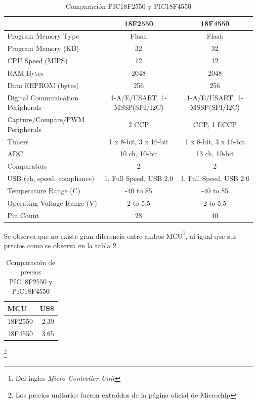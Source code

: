 \begin{table}[htp]
\begin{scriptsize}
\centering
\begin{tabular*}{\textwidth}{@{\extracolsep{\fill}}|l|c|c|} \hline
 \rowcolor[gray]{.9}
 & 18F2550 & 18F4550 												\\ \hline 
 Program Memory Type & Flash & Flash								\\ \hline
 Program Memory (KB) & 32 & 32										\\ \hline
 CPU Speed (MIPS) & 12 & 12											\\ \hline
 RAM Bytes & 2048 & 2048											\\ \hline
 Data EEPROM (bytes) & 256 & 256									\\ \hline
 Digital Communication Peripherals & 1-A/E/USART, 1-MSSP(SPI/I2C) &
1-A/E/USART, 1-MSSP(SPI/I2C) 										\\ \hline
 Capture/Compare/PWM Peripherals & 2 CCP &  CCP, 1 ECCP 			\\ \hline
 Timers & 1 x 8-bit, 3 x 16-bit & 1 x 8-bit, 3 x 16-bit 			\\ \hline
 ADC & 10 ch, 10-bit & 13 ch, 10-bit								\\ \hline
 Comparators & 2 & 2 												\\ \hline
 USB (ch, speed, compliance) & 1, Full Speed, USB 2.0 & 1, Full Speed, USB 2.0
																	\\ \hline
 Temperature Range (C) & -40 to 85 & -40 to 85  					\\ \hline
 Operating Voltage Range (V) & 2 to 5.5 & 2 to 5.5					\\ \hline
 Pin Count & 28 & 40												\\ \hline
\end{tabular*}
\caption{Comparaci\'on PIC18F2550 y PIC18F4550} 
\label{tab:table_12_14}
\end{scriptsize}
\end{table}


Se observa que no existe gran diferencia entre ambos MCU\footnote{Del ingles
\emph{Micro Controller Unit}}, al igual que sus precios como se observa en la
tabla \ref{tab:table_12_14_price}.

\begin{table}[htp]
\centering
\begin{tabular}{l|r}
 \toprule
  MCU & US\$		\\ \hline
 18F2550 & 2.39  	\\ 
 18F4550 & 3.65 	\\
 \bottomrule
\end{tabular}

\begin{tiny} 
\caption{Comparaci\'on de precios PIC18F2550 y PIC18F4550}\footnote{Los precios
unitarios fueron extraidos de la p\'agina oficial de Microchip}
\end{tiny} 
\label{tab:table_12_14_price}
\end{table}

